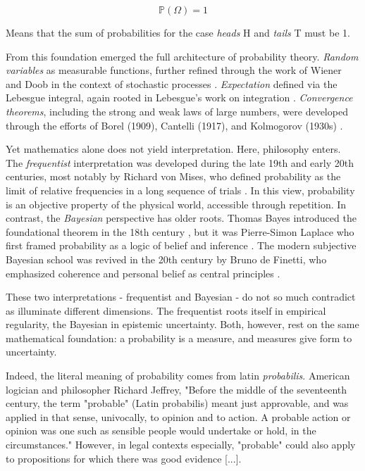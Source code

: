 \documentclass{book}
\begin{document}
\begin{equation}
	\mathbb{P} (\Omega) = 1
\end{equation}

Means that the sum of probabilities for the case \textit{heads} H and \textit{tails} T must be 1. 

\medskip

From this foundation emerged the full architecture of probability theory. \emph{Random variables} as measurable functions, further refined through the work of Wiener and Doob in the context of stochastic processes \cite{doob1953}. \emph{Expectation} defined via the Lebesgue integral, again rooted in Lebesgue’s work on integration \cite{lebesgue1902}. \emph{Convergence theorems}, including the strong and weak laws of large numbers, were developed through the efforts of Borel (1909), Cantelli (1917), and Kolmogorov (1930s) \cite{billingsley1995}.

\medskip

Yet mathematics alone does not yield interpretation. Here, philosophy enters. The \emph{frequentist} interpretation was developed during the late 19th and early 20th centuries, most notably by Richard von Mises, who defined probability as the limit of relative frequencies in a long sequence of trials \cite{vonmises1928}. In this view, probability is an objective property of the physical world, accessible through repetition. In contrast, the \emph{Bayesian} perspective has older roots. Thomas Bayes introduced the foundational theorem in the 18th century \cite{bayes1763}, but it was Pierre-Simon Laplace who first framed probability as a logic of belief and inference \cite{laplace1812}. The modern subjective Bayesian school was revived in the 20th century by Bruno de Finetti, who emphasized coherence and personal belief as central principles \cite{definetti1974}.

\medskip

These two interpretations - frequentist and Bayesian - do not so much contradict as illuminate different dimensions. The frequentist roots itself in empirical regularity, the Bayesian in epistemic uncertainty. Both, however, rest on the same mathematical foundation: a probability is a measure, and measures give form to uncertainty. 

\medskip

Indeed, the literal meaning of probability comes from latin \textit{probabilis}. American logician and philosopher Richard Jeffrey, "Before the middle of the seventeenth century, the term "probable" (Latin probabilis) meant just approvable, and was applied in that sense, univocally, to opinion and to action. A probable action or opinion was one such as sensible people would undertake or hold, in the circumstances." However, in legal contexts especially, "probable" could also apply to propositions for which there was good evidence [...].
\end{document}

